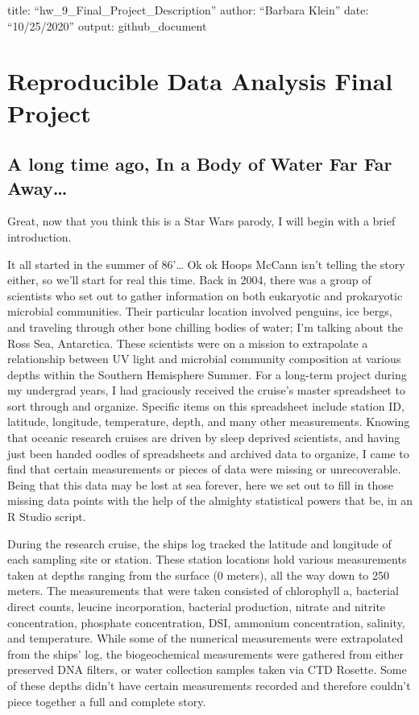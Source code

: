 \documentclass[
]{article}
\author{}
\date{\vspace{-2.5em}}
\begin{document}
title: ``hw\_9\_Final\_Project\_Description'' author: ``Barbara Klein''
date: ``10/25/2020'' output: github\_document

\hypertarget{reproducible-data-analysis-final-project}{%
\section{\texorpdfstring{\textbf{Reproducible Data Analysis Final
Project}}{Reproducible Data Analysis Final Project}}\label{reproducible-data-analysis-final-project}}

\hypertarget{a-long-time-ago-in-a-body-of-water-far-far-away}{%
\subsection{A long time ago, In a Body of Water Far Far
Away\ldots{}}\label{a-long-time-ago-in-a-body-of-water-far-far-away}}

Great, now that you think this is a Star Wars parody, I will begin with
a brief introduction.

It all started in the summer of 86'\ldots{} Ok ok Hoops McCann isn't
telling the story either, so we'll start for real this time. Back in
2004, there was a group of scientists who set out to gather information
on both eukaryotic and prokaryotic microbial communities. Their
particular location involved penguins, ice bergs, and traveling through
other bone chilling bodies of water; I'm talking about the Ross Sea,
Antarctica. These scientists were on a mission to extrapolate a
relationship between UV light and microbial community composition at
various depths within the Southern Hemisphere Summer. For a long-term
project during my undergrad years, I had graciously received the
cruise's master spreadsheet to sort through and organize. Specific items
on this spreadsheet include station ID, latitude, longitude,
temperature, depth, and many other measurements. Knowing that oceanic
research cruises are driven by sleep deprived scientists, and having
just been handed oodles of spreadsheets and archived data to organize, I
came to find that certain measurements or pieces of data were missing or
unrecoverable. Being that this data may be lost at sea forever, here we
set out to fill in those missing data points with the help of the
almighty statistical powers that be, in an R Studio script.

During the research cruise, the ships log tracked the latitude and
longitude of each sampling site or station. These station locations hold
various measurements taken at depths ranging from the surface (0
meters), all the way down to 250 meters. The measurements that were
taken consisted of chlorophyll a, bacterial direct counts, leucine
incorporation, bacterial production, nitrate and nitrite concentration,
phosphate concentration, DSI, ammonium concentration, salinity, and
temperature. While some of the numerical measurements were extrapolated
from the ships' log, the biogeochemical measurements were gathered from
either preserved DNA filters, or water collection samples taken via CTD
Rosette. Some of these depths didn't have certain measurements recorded
and therefore couldn't piece together a full and complete story.
\end{document}
